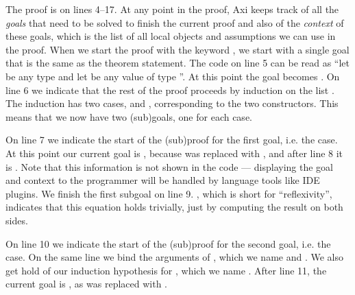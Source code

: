 The proof is on lines 4--17. At any point in the proof, Axi keeps track of all the \textit{goals} that need to be solved to finish the current proof and also of the \textit{context} of these goals, which is the list of all local objects and assumptions we can use in the proof. When we start the proof with the keyword , we start with a single goal that is the same as the theorem statement. The code on line 5 can be read as ``let  be any type and let  be any value of type ''. At this point the goal becomes . On line 6 we indicate that the rest of the proof proceeds by induction on the list . The induction has two cases,  and , corresponding to the two  constructors. This means that we now have two (sub)goals, one for each case.

On line 7 we indicate the start of the (sub)proof for the first goal, i.e. the  case. At this point our current goal is , because  was replaced with , and after line 8 it is . Note that this information is not shown in the code --- displaying the goal and context to the programmer will be handled by language tools like IDE plugins. We finish the first subgoal on line 9. , which is short for ``reflexivity'', indicates that this equation holds trivially, just by computing the result on both sides.

On line 10 we indicate the start of the (sub)proof for the second goal, i.e. the  case. On the same line we bind the arguments of , which we name  and . We also get hold of our induction hypothesis for , which we name . After line 11, the current goal is , as  was replaced with .

